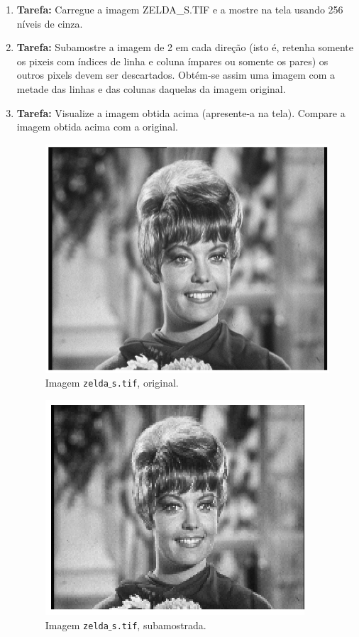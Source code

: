 \documentclass[11pt]{article}
\begin{document}
\begin{enumerate}

\item \textbf{Tarefa:} Carregue a imagem \textsf{ZELDA\_S.TIF} e a mostre na tela usando 256 níveis de cinza.

\item \textbf{Tarefa:} Subamostre a imagem de 2 em cada direção (isto é, retenha somente os pixeis com índices de linha e coluna ímpares ou somente os pares) os outros pixels devem ser descartados. Obtém-se assim uma imagem com a metade das linhas e das colunas daquelas da imagem original.

\item \textbf{Tarefa:} Visualize a imagem obtida acima (apresente-a na tela). Compare a imagem obtida acima com a original.\label{sub_cor_1}

\begin{figure}[hbt!]
	\centering
	\includegraphics[scale=1]{../imgs/zelda.eps}
	\caption{Imagem \texttt{zelda$\_$s.tif}, original.}
\end{figure}

\begin{figure}[hbt!]
	\centering
	\includegraphics[scale=1]{../imgs/zelda_sub.eps}
	\caption{Imagem \texttt{zelda$\_$s.tif}, subamostrada.}
\end{figure}


\end{enumerate}
\end{document}
